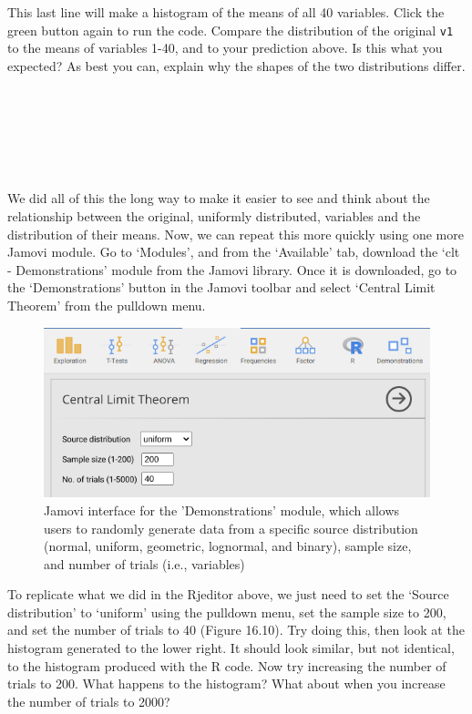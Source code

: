 \documentclass[
]{scrbook}
\begin{document}
This last line will make a histogram of the means of all 40 variables.
Click the green button again to run the code.
Compare the distribution of the original \texttt{v1} to the means of variables 1-40, and to your prediction above.
Is this what you expected?
As best you can, explain why the shapes of the two distributions differ.

\begin{verbatim}






\end{verbatim}

We did all of this the long way to make it easier to see and think about the relationship between the original, uniformly distributed, variables and the distribution of their means.
Now, we can repeat this more quickly using one more Jamovi module.
Go to `Modules', and from the `Available' tab, download the `clt - Demonstrations' module from the Jamovi library.
Once it is downloaded, go to the `Demonstrations' button in the Jamovi toolbar and select `Central Limit Theorem' from the pulldown menu.

\begin{figure}
\includegraphics[width=0.8\linewidth]{img/jamovi_clt} \caption{Jamovi interface for the 'Demonstrations' module, which allows users to randomly generate data from a specific source distribution (normal, uniform, geometric, lognormal, and binary), sample size, and number of trials (i.e., variables)}\label{fig:unnamed-chunk-81}
\end{figure}

To replicate what we did in the Rjeditor above, we just need to set the `Source distribution' to `uniform' using the pulldown menu, set the sample size to 200, and set the number of trials to 40 (Figure 16.10).
Try doing this, then look at the histogram generated to the lower right.
It should look similar, but not identical, to the histogram produced with the R code.
Now try increasing the number of trials to 200.
What happens to the histogram?
What about when you increase the number of trials to 2000?
\end{document}
